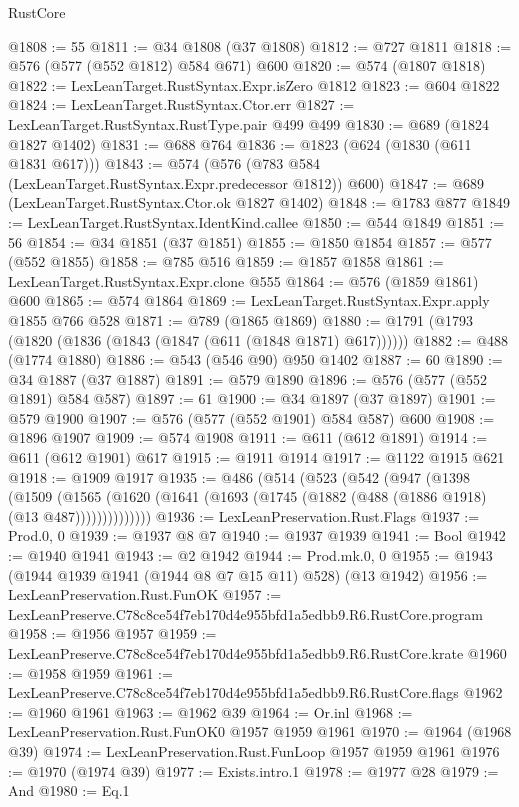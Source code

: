 \begin{lexlean}{RustCore}
\begin{coremodule}
@1808 := 55
@1811 := @34 @1808 (@37 @1808)
@1812 := @727 @1811
@1818 := @576 (@577 (@552 @1812) @584 @671) @600
@1820 := @574 (@1807 @1818)
@1822 := LexLeanTarget.RustSyntax.Expr.isZero @1812
@1823 := @604 @1822
@1824 := LexLeanTarget.RustSyntax.Ctor.err
@1827 := LexLeanTarget.RustSyntax.RustType.pair @499 @499
@1830 := @689 (@1824 @1827 @1402)
@1831 := @688 @764
@1836 := @1823 (@624 (@1830 (@611 @1831 @617)))
@1843 := @574 (@576 (@783 @584 (LexLeanTarget.RustSyntax.Expr.predecessor @1812)) @600)
@1847 := @689 (LexLeanTarget.RustSyntax.Ctor.ok @1827 @1402)
@1848 := @1783 @877
@1849 := LexLeanTarget.RustSyntax.IdentKind.callee
@1850 := @544 @1849
@1851 := 56
@1854 := @34 @1851 (@37 @1851)
@1855 := @1850 @1854
@1857 := @577 (@552 @1855)
@1858 := @785 @516
@1859 := @1857 @1858
@1861 := LexLeanTarget.RustSyntax.Expr.clone @555
@1864 := @576 (@1859 @1861) @600
@1865 := @574 @1864
@1869 := LexLeanTarget.RustSyntax.Expr.apply @1855 @766 @528
@1871 := @789 (@1865 @1869)
@1880 := @1791 (@1793 (@1820 (@1836 (@1843 (@1847 (@611 (@1848 @1871) @617))))))
@1882 := @488 (@1774 @1880)
@1886 := @543 (@546 @90) @950 @1402
@1887 := 60
@1890 := @34 @1887 (@37 @1887)
@1891 := @579 @1890
@1896 := @576 (@577 (@552 @1891) @584 @587)
@1897 := 61
@1900 := @34 @1897 (@37 @1897)
@1901 := @579 @1900
@1907 := @576 (@577 (@552 @1901) @584 @587) @600
@1908 := @1896 @1907
@1909 := @574 @1908
@1911 := @611 (@612 @1891)
@1914 := @611 (@612 @1901) @617
@1915 := @1911 @1914
@1917 := @1122 @1915 @621
@1918 := @1909 @1917
@1935 := @486
    (@514
      (@523
        (@542
          (@947
            (@1398
              (@1509
                (@1565
                  (@1620 (@1641 (@1693 (@1745 (@1882 (@488 (@1886 @1918) (@13 @487))))))))))))))
@1936 := LexLeanPreservation.Rust.Flags
@1937 := Prod.{0, 0}
@1939 := @1937 @8 @7
@1940 := @1937 @1939
@1941 := Bool
@1942 := @1940 @1941
@1943 := @2 @1942
@1944 := Prod.mk.{0, 0}
@1955 := @1943 (@1944 @1939 @1941 (@1944 @8 @7 @15 @11) @528) (@13 @1942)
@1956 := LexLeanPreservation.Rust.FunOK
@1957 := LexLeanPreserve.C78c8ce54f7eb170d4e955bfd1a5edbb9.R6.RustCore.program
@1958 := @1956 @1957
@1959 := LexLeanPreserve.C78c8ce54f7eb170d4e955bfd1a5edbb9.R6.RustCore.krate
@1960 := @1958 @1959
@1961 := LexLeanPreserve.C78c8ce54f7eb170d4e955bfd1a5edbb9.R6.RustCore.flags
@1962 := @1960 @1961
@1963 := @1962 @39
@1964 := Or.inl
@1968 := LexLeanPreservation.Rust.FunOK0 @1957 @1959 @1961
@1970 := @1964 (@1968 @39)
@1974 := LexLeanPreservation.Rust.FunLoop @1957 @1959 @1961
@1976 := @1970 (@1974 @39)
@1977 := Exists.intro.{1}
@1978 := @1977 @28
@1979 := And
@1980 := Eq.{1}

\end{coremodule}
\end{lexlean}
